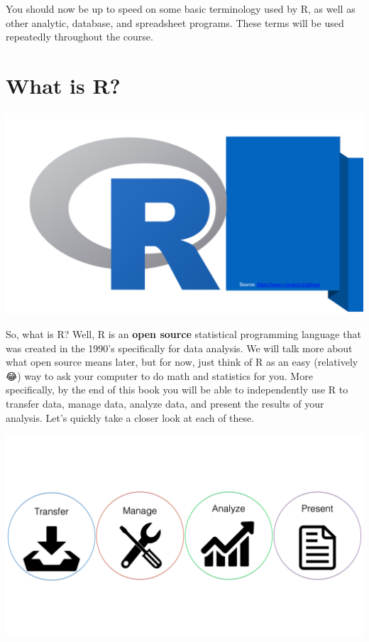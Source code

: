 \documentclass[
  letterpaper,
  DIV=11,
  numbers=noendperiod]{scrreprt}
\begin{document}
You should now be up to speed on some basic terminology used by R, as
well as other analytic, database, and spreadsheet programs. These terms
will be used repeatedly throughout the course.

\section{What is R?}\label{what-is-r-1}

\includegraphics{chapters/what_is_r/r_logo.png}

So, what is R? Well, R is an \textbf{open source} statistical
programming language that was created in the 1990's specifically for
data analysis. We will talk more about what open source means later, but
for now, just think of R as an easy (relatively 😂) way to ask your
computer to do math and statistics for you. More specifically, by the
end of this book you will be able to independently use R to transfer
data, manage data, analyze data, and present the results of your
analysis. Let's quickly take a closer look at each of these.

\includegraphics{chapters/what_is_r/competencies_overview.png}
\end{document}
